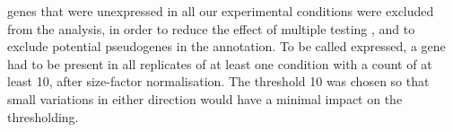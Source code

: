 \trna genes that were unexpressed in all our experimental conditions were
excluded from the analysis, in order to reduce the effect of multiple testing
\citep{Bourgon:2010}, and to exclude potential pseudogenes in the annotation. To
be called expressed, a \trna gene had to be present in all replicates of at
least one condition with a count of at least \num{10}, after size-factor
normalisation. The threshold \num{10} was chosen so that small variations in
either direction would have a minimal impact on the thresholding.

%
%
%
